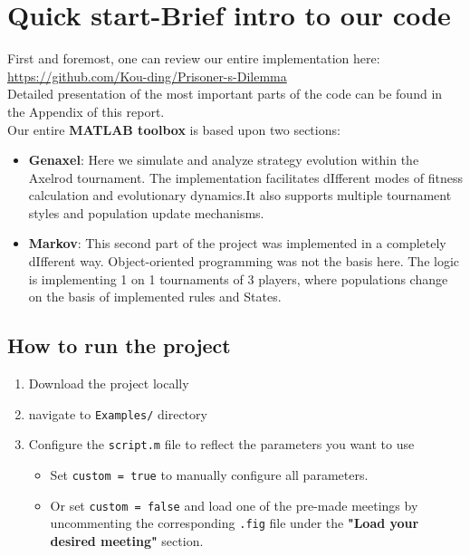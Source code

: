 \documentclass[12pt]{report}
\begin{document}
\section{Quick start-Brief intro to our code}
First and foremost, one can review our entire implementation here:\\ \url{https://github.com/Kou-ding/Prisoner-s-Dilemma}\\
Detailed presentation of the most important parts of the code can be found in the Appendix of this report.\\
Our entire \textbf{MATLAB toolbox} is based upon two sections:
\begin{itemize}
    \item \textbf{Genaxel}: Here we simulate and analyze strategy evolution within the Axelrod tournament. The implementation facilitates dIfferent modes of
fitness calculation and evolutionary dynamics.It also supports multiple tournament styles and population update mechanisms.
    \item  \textbf{Markov}: This second part of the project was implemented in a completely dIfferent way. Object-oriented programming was not the basis here. The logic is implementing 1 on 1 tournaments of 3 players, where populations change on the basis of implemented rules and States.
\end{itemize}
\subsection{How to run the project}
\begin{enumerate}
    \item Download the project locally
    \item navigate to \texttt{Examples/} directory
    \item Configure the \texttt{script.m} file to reflect the parameters you want to use
    \begin{itemize}
        \item Set \texttt{custom = true} to manually configure all parameters.
        \item Or set \texttt{custom = false} and load one of the pre-made meetings by uncommenting the corresponding \texttt{.fig} file under the \textbf{"Load your desired meeting"} section.
    \end{itemize}
\end{enumerate}
\end{document}
